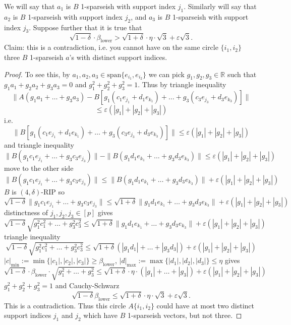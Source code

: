 \documentclass[11pt]{amsart}
\newcommand{\R}{\mathbb{R}}
\begin{document}
We will say that $a_1$ is $B$ 1-sparseish with support index $j_1$.
Similarly will say that $a_2$ is $B$ 1-sparseish with support index $j_2$, and  $a_3$ is $B$ 1-sparseish with support index $j_3$. 
Suppose further that it is true that 
\[\sqrt{1-\delta} \cdot \beta_\text{lower}  > \sqrt{1+\delta} \cdot \eta \cdot \sqrt{3}+ \varepsilon \sqrt{3}.\]
Claim: this is a contradiction, i.e. you cannot have on the same circle $\{i_1,i_2\}$ three $B$ 1-sparseish $a$'s with distinct support indices.
\begin{proof}
To see this, by $a_1, a_2, a_3\in \text{span}\{e_{i_1}, e_{i_2}\}$ we can pick $g_1, g_2, g_3\in \R$ such that 
$g_1a_1+g_2a_2 +g_3a_3=0$ and $g_1^2+g_2^2+g_3^2=1$.  
Thus by triangle inequality
\[\|A(g_1a_1+\ldots+g_3a_3)-B[g_1(c_1e_{j_1}+d_1e_{k_1})+\ldots +g_3(c_3e_{j_3}+d_3e_{k_3})]\| \]
\[\leq \varepsilon (|g_1|+|g_2|+|g_3|)\]
i.e.
\[\|B[g_1(c_1e_{j_1}+d_1e_{k_1})+\ldots +g_3(c_3e_{j_3}+d_3e_{k_3})]\| \leq \varepsilon (|g_1|+|g_2|+|g_3|)\]
and triangle inequality
\[\|B(g_1c_1e_{j_1}+\ldots +g_3c_3e_{j_3})\|  - \|B(g_1d_1e_{k_1}+\ldots +g_3d_3e_{k_3})\|\leq \varepsilon (|g_1|+|g_2|+|g_3|)\]
move to the other side
\[\|B(g_1c_1e_{j_1}+\ldots +g_3c_3e_{j_3})\|  \leq \|B(g_1d_1e_{k_1}+\ldots +g_3d_3e_{k_3})\|+ \varepsilon (|g_1|+|g_2|+|g_3|)\]
$B$ is $(4,\delta)$-RIP so
\[\sqrt{1-\delta}\|g_1c_1e_{j_1}+\ldots +g_3c_3e_{j_3}\|  \leq \sqrt{1+\delta}\|g_1d_1e_{k_1}+\ldots +g_3d_3e_{k_3}\|+ \varepsilon (|g_1|+|g_2|+|g_3|)\]
distinctness of  $j_1, j_2, j_3\in [p]$ gives
\[\sqrt{1-\delta}\sqrt{g_1^2c_1^2+\ldots +g_3^2c_3^2}  \leq \sqrt{1+\delta}\|g_1d_1e_{k_1}+\ldots +g_3d_3e_{k_3}\|+ \varepsilon (|g_1|+|g_2|+|g_3|)\]
triangle inequality
\[\sqrt{1-\delta}\sqrt{g_1^2c_1^2+\ldots +g_3^2c_3^2}  \leq \sqrt{1+\delta}(|g_1d_1|+\ldots +|g_3d_3|)+ \varepsilon (|g_1|+|g_2|+|g_3|)\]
$|c|_\text{min} :=\min\{|c_1|,|c_2|,|c_3|\}\geq \beta_\text{lower}$, $|d|_\text{max} :=\max\{|d_1|,|d_2|,|d_3|\}\leq \eta$ gives
\[\sqrt{1-\delta} \cdot \beta_\text{lower}\cdot \sqrt{g_1^2+\ldots +g_3^2}  \leq \sqrt{1+\delta} \cdot \eta  \cdot (|g_1|+\ldots +|g_3|)+ \varepsilon (|g_1|+|g_2|+|g_3|)\]
$g_1^2+g_2^2+g_3^2=1$ and Cauchy-Schwarz
\[\sqrt{1-\delta} \beta_\text{lower}  \leq \sqrt{1+\delta} \cdot \eta \cdot \sqrt{3}+ \varepsilon \sqrt{3}.\]
This is a contradiction.
Thus this circle $A\{i_1,i_2\}$ could have at most two distinct support indices $j_1$ and $j_2$ 
which have $B$ 1-sparseish vectors, but not three.
\end{proof}
\end{document}
